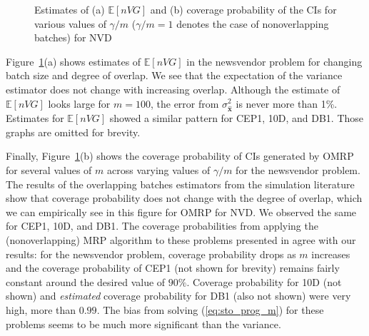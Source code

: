 \documentclass[12pt]{article}
\newcommand{\e}[1]{\mathbb{E} \left[ #1 \right]
}
\newcommand{\x}{\mathbf{x}}
\newcommand{\xh}{{\hat{\x}}}
\begin{document}
\begin{figure}[htb!]
	\centering
	\caption{ 
		Estimates of
		(a) $\e{nVG}$ and 
		(b) coverage probability of the CIs for various values of $\gamma/m$ ($\gamma/m=1$ denotes the case of nonoverlapping batches)
		 for NVD
	}
\label{fig:nv}
\end{figure}


Figure~\ref{fig:nv}(a) shows estimates of $\e{nVG}$ in the newsvendor problem for changing batch size and degree of overlap. 
We see that the expectation of the variance estimator does not change with increasing overlap. 
Although the estimate of $\e{nVG}$ looks large for $m=100$, the error from $\sigma^2_\xh$ is never more than 1\%.  
Estimates for $\e{nVG}$ showed a similar pattern for CEP1, 10D, and DB1.  
Those graphs are omitted for brevity.

Finally, Figure~\ref{fig:nv}(b) shows the coverage probability of CIs generated by OMRP for several values of $m$ across varying values of $\gamma/m$ for the newsvendor problem.  
The results of the overlapping batches estimators from the simulation literature show that coverage probability does not change with the degree of overlap, which we can  empirically see in this figure for OMRP for NVD.
We observed the same for CEP1, 10D, and DB1.  
The coverage probabilities from applying the (nonoverlapping) MRP algorithm to these problems presented in \cite{Bayraksan2006} agree with our results: for the newsvendor problem, coverage probability drops as $m$ increases and the coverage probability of CEP1 (not shown for brevity) remains fairly constant around the desired value of $90\%$. 
Coverage probability for 10D (not shown) and {\it estimated} coverage probability for DB1 (also not shown) were very high, more than $0.99$.  
The bias from solving (\ref{eq:sto_prog_m}) for these problems seems to be much more significant than the variance.
\end{document}
